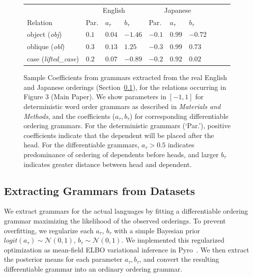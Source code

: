 \documentclass[10pt,twoside,lineno]{article}
\begin{document}
\begin{figure}
	\begin{center}
\begin{tabular}{l||l|ll||l|lllll}
	& \multicolumn{3}{c||}{English}    &  \multicolumn{3}{c}{Japanese}  \\ 
	Relation                     &  Par.   & $a_\tau$ & $b_\tau$            & Par.   & $a_\tau$ & $b_\tau$     \\ \hline \hline
	object (\textit{obj})        &  $0.1$   &   $0.04$   & $-1.46$            & $-0.1$  & $0.99$ & $-0.7$2 \\
	oblique (\textit{obl})       &  $0.3$   &   $0.13$     & $1.25$             & $-0.3$  & $0.99$ & $0.73$ \\
	case (\textit{lifted\_case}) &  $0.2$   &   $0.07$       &   $-0.89$         & $-0.2$  &  $0.92$ & $0.02$  \\
\end{tabular}
	\end{center}
	\caption{Sample Coefficients from grammars extracted from the real English and Japanese orderings (Section~\ref{sec:extract-grammars}), for the relations occurring in Figure 3 (Main Paper). We show parameters in $[-1,1]$ for deterministic word order grammars as described in \emph{Materials and Methods}, and the coefficients ($a_\tau, b_\tau$) for corresponding differentiable ordering grammars. For the deterministic grammars (`Par.'), positive coefficients indicate that the dependent will be placed after the head. For the differentiable grammars, $a_\tau > 0.5$ indicates predominance of ordering of dependents before heads, and larger $b_\tau$ indicates greater distance between head and dependent.}\label{fig:grammar-sample}
\end{figure}


\subsection{Extracting Grammars from Datasets}\label{sec:extract-grammars}
We extract grammars for the actual languages by fitting a differentiable ordering grammar maximizing the likelihood of the observed orderings.
To prevent overfitting, we regularize each $a_\tau$, $b_\tau$ with a simple Bayesian prior $logit(a_\tau) \sim \mathcal{N}(0,1)$, $b_\tau \sim \mathcal{N}(0,1)$.
We implemented this regularized optimization as mean-field ELBO variational inference in Pyro~\cite{bingham2018pyro}.
We then extract the posterior means for each parameter $a_\tau, b_\tau$, and convert the resulting differentiable grammar into an ordinary ordering grammar.
\end{document}
